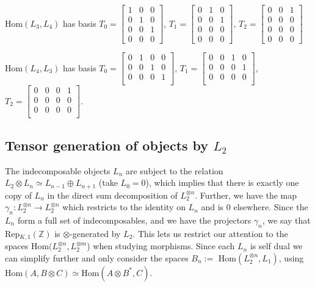 \documentclass[11pt]{article} %
\newcommand{\repz}{Rep$_{K,1}(\mathbb{Z})$}
\begin{document}
 Hom$(L_3,L_4)$ has basis $T_0 = \begin{bmatrix}
 1 & 0 & 0 \\
 0 & 1 & 0 \\
 0 & 0 & 1 \\
 0 & 0 & 0 
\end{bmatrix}$, $T_1 = \begin{bmatrix}
 0 & 1 & 0 \\
 0 & 0 & 1 \\
0 & 0 & 0 \\
 0 & 0 & 0 
\end{bmatrix}$, $T_2 = \begin{bmatrix}
 0 & 0 & 1 \\
 0 & 0 & 0 \\
 0 & 0 & 0 \\
 0 & 0 & 0
\end{bmatrix}$

 Hom$(L_4,L_3)$ has basis $T_0 = \begin{bmatrix}
 0 & 1 & 0 & 0 \\
 0 & 0 & 1 & 0 \\
 0 & 0 & 0 & 1 \\
\end{bmatrix}$, $T_1 = \begin{bmatrix}
 0 & 0 & 1 & 0 \\
 0 & 0 & 0 & 1 \\
 0 & 0 & 0 & 0 \\
\end{bmatrix}$, $T_2 = \begin{bmatrix}
 0 & 0 & 0 & 1 \\
 0 & 0 & 0 & 0 \\
 0 & 0 & 0 & 0 \\
\end{bmatrix}$.

\subsection{Tensor generation of objects by $L_2$}
The indecomposable objects $L_n$ are subject to the relation $L_2 \otimes L_n \simeq L_{n-1} \oplus L_{n+1}$ (take $L_0 = 0$), which implies that there is exactly one copy of $L_n$ in the direct sum decomposition of $L_2^{\otimes n}$. Further, we have the map $\gamma_n: L_2^{\otimes n} \rightarrow L_2^{\otimes n}$ which restricts to the identity on $L_n$ and is $0$ elsewhere. Since the $L_n$ form a full set of indecomposables, and we have the projectors $\gamma_n$, we say that \repz \hspace{.2mm} is $\otimes$-generated by $L_2$. This lets us restrict our attention to the spaces Hom$(L_2^{\otimes n}, L_2^{\otimes m}$) when studying morphisms. Since each $L_n$ is self dual we can simplify further and only consider the spaces $B_n :=$ Hom$(L_2^{\otimes n}, L_1)$, using Hom$(A, B \otimes C) \simeq \text{Hom}(A \otimes B^{\ast},C)$.
\end{document}
